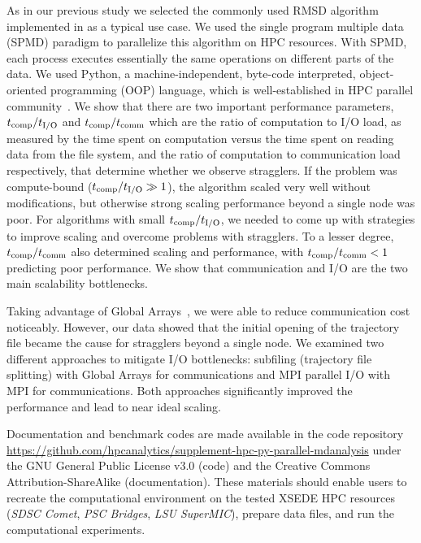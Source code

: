As in our previous study we selected the commonly used RMSD algorithm implemented in  as a typical use case.
We used the single program multiple data (SPMD) paradigm to parallelize this algorithm on HPC resources.
With SPMD, each process executes essentially the same operations on different parts of the data. 
We used Python, a machine-independent, byte-code interpreted, object-oriented programming (OOP) language, which is well-established in HPC parallel community~\cite{GAiN}. 
We show that there are two important performance parameters, ${t}_{\text{comp}}/{t}_{\text{I/O}}$ and ${t}_{\text{comp}}/t_{\text{comm}}$ which are the ratio of computation to I/O load, as measured by the time spent on computation versus the time spent on reading data from the file system, and the ratio of computation to communication load respectively, that determine whether we observe stragglers.
If the problem was compute-bound (${t}_{\text{comp}}/{t}_{\text{I/O}} \gg 1$), the algorithm scaled very well without modifications, but otherwise strong scaling performance beyond a single node was poor.  
For algorithms with small ${t}_{\text{comp}}/{t}_{\text{I/O}}$, we needed to come up with strategies to improve scaling and overcome problems with stragglers.
To a lesser degree, ${t}_{\text{comp}}/t_{\text{comm}}$ also determined scaling and performance, with ${t}_{\text{comp}}/t_{\text{comm}} < 1$ predicting poor performance.
We show that communication and I/O are the two main scalability bottlenecks.

Taking advantage of Global Arrays~\cite{GA, GAiN}, we were able to reduce communication cost noticeably.
However, our data showed that the initial opening of the trajectory file became the cause for stragglers beyond a single node.
We examined two different approaches to mitigate I/O bottlenecks: subfiling (trajectory file splitting) with Global Arrays for communications and MPI parallel I/O with MPI for communications.
Both approaches significantly improved the performance and lead to near ideal scaling.

Documentation and benchmark codes are made available in the code repository \url{https://github.com/hpcanalytics/supplement-hpc-py-parallel-mdanalysis} under the GNU General Public License v3.0 (code) and the Creative Commons Attribution-ShareAlike (documentation). 
These materials should enable users to recreate the computational environment on the tested XSEDE HPC resources (\emph{SDSC Comet}, \emph{PSC Bridges}, \emph{LSU SuperMIC}), prepare data files, and run the computational experiments.
